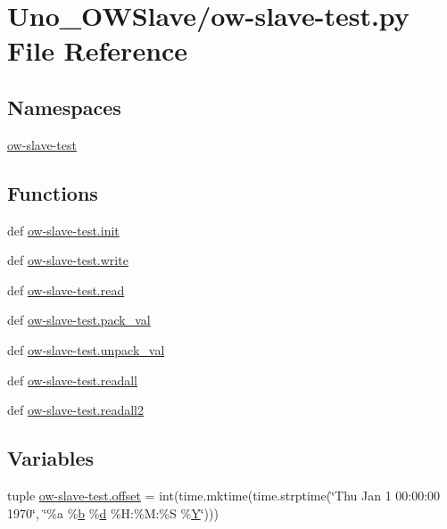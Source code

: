 \hypertarget{ow-slave-test_8py}{\section{Uno\-\_\-\-O\-W\-Slave/ow-\/slave-\/test.py File Reference}
\label{ow-slave-test_8py}
}
\subsection*{Namespaces}
\begin{DoxyCompactItemize}
\item 
\hyperlink{namespaceow-slave-test}{ow-\/slave-\/test}
\end{DoxyCompactItemize}
\subsection*{Functions}
\begin{DoxyCompactItemize}
\item 
def \hyperlink{namespaceow-slave-test_ab091aabaec0d431fbd8f2966c4ad2b34}{ow-\/slave-\/test.\-init}
\item 
def \hyperlink{namespaceow-slave-test_a6208e9fac4a2985c7004148f0c6f3a0b}{ow-\/slave-\/test.\-write}
\item 
def \hyperlink{namespaceow-slave-test_a91854caa9cb46af512a1868311c2eb26}{ow-\/slave-\/test.\-read}
\item 
def \hyperlink{namespaceow-slave-test_a64b1d041927699889619c1d9164a23b4}{ow-\/slave-\/test.\-pack\-\_\-val}
\item 
def \hyperlink{namespaceow-slave-test_ac894ce4758d4c4841f29c609063bf5a2}{ow-\/slave-\/test.\-unpack\-\_\-val}
\item 
def \hyperlink{namespaceow-slave-test_a84f5a1017b72cca872e223e58758e94f}{ow-\/slave-\/test.\-readall}
\item 
def \hyperlink{namespaceow-slave-test_a7c6f6e730ee5db6816886742e49355b5}{ow-\/slave-\/test.\-readall2}
\end{DoxyCompactItemize}
\subsection*{Variables}
\begin{DoxyCompactItemize}
\item 
tuple \hyperlink{namespaceow-slave-test_aabcf0d09fb3ab10a273d0b662db302c3}{ow-\/slave-\/test.\-offset} = int(time.\-mktime(time.\-strptime(\char`\"{}Thu Jan 1 00\-:00\-:00 1970\char`\"{}, \char`\"{}\%a \%\hyperlink{IMU_8cpp_a20f3a6e8a2ba2537edf801801628417b}{b} \%\hyperlink{OWGeneric__DangerShield_8ino_a22871ee78191bcd7676a38358795104e}{d} \%H\-:\%M\-:\%S \%\hyperlink{OWGeneric__SensorStation_8ino_ac915220fb659eb2c5958a1ccd81b80d4}{Y}\char`\"{})))
\end{DoxyCompactItemize}
